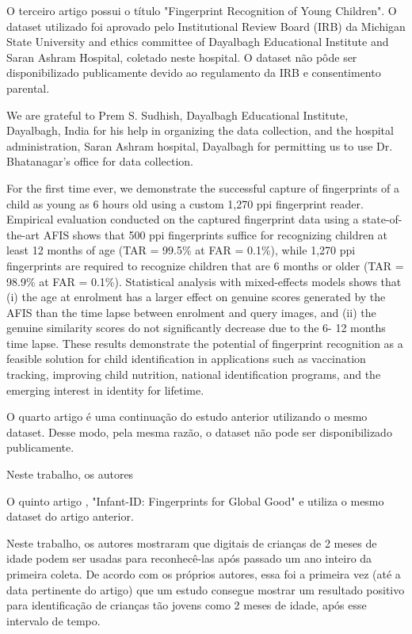 \documentclass[12pt,a4paper]{article}
\begin{document}
O terceiro artigo \cite{pre-infant-id} possui o título "Fingerprint Recognition of Young Children". O dataset utilizado foi aprovado pelo Institutional Review Board (IRB) da Michigan State University and ethics committee of Dayalbagh Educational Institute and Saran Ashram Hospital, coletado neste hospital. O dataset não pôde ser disponibilizado publicamente devido ao regulamento da IRB e consentimento parental.

We are grateful to Prem S. Sudhish, Dayalbagh Educational Institute, Dayalbagh, India for his help in organizing the data collection, and the hospital administration, Saran Ashram hospital, Dayalbagh for permitting us to use Dr. Bhatanagar’s office for data collection.

For the first time ever, we demonstrate the
successful capture of fingerprints of a child as young as 6 hours
old using a custom 1,270 ppi fingerprint reader. Empirical
evaluation conducted on the captured fingerprint data using a
state-of-the-art AFIS shows that 500 ppi fingerprints suffice for
recognizing children at least 12 months of age (TAR = 99.5\%
at FAR = 0.1\%), while 1,270 ppi fingerprints are required to
recognize children that are 6 months or older (TAR = 98.9\% at
FAR = 0.1\%). Statistical analysis with mixed-effects models
shows that (i) the age at enrolment has a larger effect on
genuine scores generated by the AFIS than the time lapse
between enrolment and query images, and (ii) the genuine
similarity scores do not significantly decrease due to the 6-
12 months time lapse. These results demonstrate the potential
of fingerprint recognition as a feasible solution for child
identification in applications such as vaccination tracking,
improving child nutrition, national identification programs, and
the emerging interest in identity for lifetime.

O quarto artigo \cite{infant-prints} é uma continuação do estudo anterior utilizando o mesmo dataset. Desse modo, pela mesma razão, o dataset não pode ser disponibilizado publicamente.

Neste trabalho, os autores

O quinto artigo \cite{infant-id}, "Infant-ID: Fingerprints for Global Good" e utiliza o mesmo dataset do artigo anterior.

Neste trabalho, os autores mostraram que digitais de crianças de 2 meses de idade podem ser usadas para reconhecê-las após passado um ano inteiro da primeira coleta. De acordo com os próprios autores, essa foi a primeira vez (até a data pertinente do artigo) que um estudo consegue mostrar um resultado positivo para identificação de crianças tão jovens como 2 meses de idade, após esse intervalo de tempo.
\end{document}
